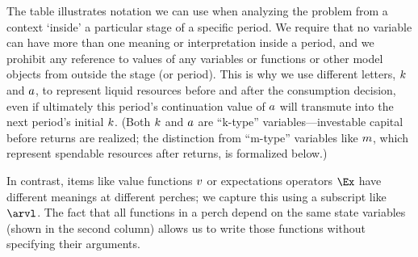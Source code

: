   The table illustrates notation we can use when analyzing the problem from a context `inside' a particular stage of a specific period.  We require that no variable can have more than one meaning or interpretation inside a period, and we prohibit any reference to values of any variables or functions or other model objects from outside the stage (or period).  This is why we use different letters, $k$ and $a$, to represent liquid resources before and after the consumption decision, even if ultimately this period's continuation value of $a$ will transmute into the next period's initial $k$.  (Both $k$ and $a$ are ``k-type'' variables---investable capital before returns are realized; the distinction from ``m-type'' variables like $m$, which represent spendable resources after returns, is formalized below.)

  In contrast, items like value functions $v$ or expectations operators $\Ex$ have different meanings at different perches; we capture this using a subscript like $\arvl$.  The fact that all functions in a perch depend on the same state variables (shown in the second column) allows us to write those functions without specifying their arguments.


\ifpseudo{
\nopagebreak
}{}

